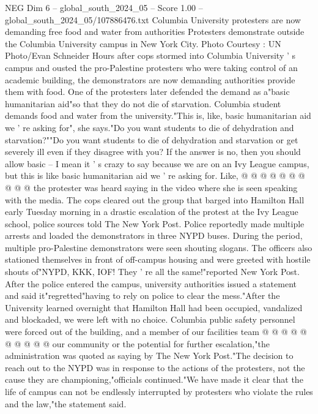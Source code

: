 \begin{textsample}{NEG Dim 6 – global\_south\_2024\_05 – Score 1.00 – global\_south\_2024\_05/107886476.txt}  \label{ex:f6_neg_242}
Columbia University protesters are now demanding free food and water from authorities Protesters demonstrate outside the Columbia University campus in New York City.
Photo Courtesy : UN Photo/Evan Schneider Hours after cops stormed into Columbia University ' s campus and ousted the pro-Palestine protesters who were taking control of an academic building, the demonstrators are now demanding authorities provide them with food.
One of the protesters later defended the demand as a"basic humanitarian aid"so that they do not die of starvation.
Columbia student demands food and water from the university."This is, like, basic humanitarian aid we ' re asking for", she says."Do you want students to die of dehydration and starvation?""Do you want students to die of dehydration and starvation or get severely ill even if they disagree with you?
If the answer is no, then you should allow basic -- I mean it ' s crazy to say because we are on an Ivy League campus, but this is like basic humanitarian aid we ' re asking for.
Like, @ @ @ @ @ @ @ @ @ @ the protester was heard saying in the video where she is seen speaking with the media.
The cops cleared out the group that barged into Hamilton Hall early Tuesday morning in a drastic escalation of the protest at the Ivy League school, police sources told The New York Post.
Police reportedly made multiple arrests and loaded the demonstrators in three NYPD buses.
During the period, multiple pro-Palestine demonstrators were seen shouting slogans.
The officers also stationed themselves in front of off-campus housing and were greeted with hostile shouts of"NYPD, KKK, IOF!
They ' re all the same!"reported New York Post.
After the police entered the campus, university authorities issued a statement and said it"regretted"having to rely on police to clear the mess."After the University learned overnight that Hamilton Hall had been occupied, vandalized and blockaded, we were left with no choice.
Columbia public safety personnel were forced out of the building, and a member of our facilities team @ @ @ @ @ @ @ @ @ @ our community or the potential for further escalation,"the administration was quoted as saying by The New York Post."The decision to reach out to the NYPD was in response to the actions of the protesters, not the cause they are championing,"officials continued."We have made it clear that the life of campus can not be endlessly interrupted by protesters who violate the rules and the law,"the statement said.

\end{textsample}
